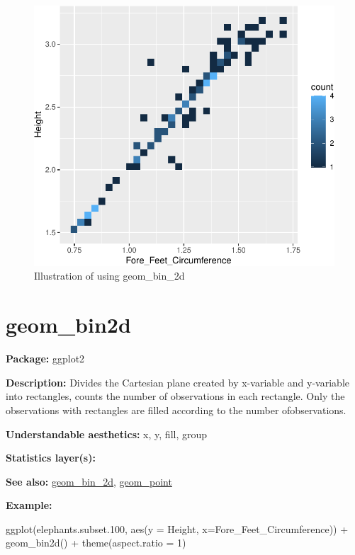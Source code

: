 \documentclass[
]{book}
\newenvironment{Shaded}{\begin{snugshade}}{\end{snugshade}}
\newcommand{\AttributeTok}[1]{\textcolor[rgb]{0.77,0.63,0.00}{#1}}
\newcommand{\DecValTok}[1]{\textcolor[rgb]{0.00,0.00,0.81}{#1}}
\newcommand{\FloatTok}[1]{\textcolor[rgb]{0.00,0.00,0.81}{#1}}
\newcommand{\FunctionTok}[1]{\textcolor[rgb]{0.00,0.00,0.00}{#1}}
\newcommand{\NormalTok}[1]{#1}
\newcommand{\SpecialCharTok}[1]{\textcolor[rgb]{0.00,0.00,0.00}{#1}}
\begin{document}
\begin{figure}
\centering
\includegraphics{Data-Visualisation-geom-Encyclopedia_files/figure-latex/unnamed-chunk-25-1.pdf}
\caption{\label{fig:unnamed-chunk-25}Illustration of using geom\_bin\_2d}
\end{figure}

\hypertarget{geom_bin2d}{%
\section{geom\_bin2d}\label{geom_bin2d}}

\textbf{Package: } ggplot2 \autocite{R-ggplot2}

\textbf{Description: } Divides the Cartesian plane created by x-variable and y-variable into rectangles, counts the number of observations in each rectangle. Only the observations with rectangles are filled according to the number ofobservations.

\textbf{Understandable aesthetics: } x, y, fill, group

\textbf{Statistics layer(s): }

\textbf{See also: } \protect\hyperlink{bin_2d}{geom\_bin\_2d}, \protect\hyperlink{point}{geom\_point}

\textbf{Example:}

\begin{Shaded}
\begin{Highlighting}[]
\FunctionTok{ggplot}\NormalTok{(elephants.subset}\FloatTok{.100}\NormalTok{, }\FunctionTok{aes}\NormalTok{(}\AttributeTok{y =}\NormalTok{ Height, }\AttributeTok{x=}\NormalTok{Fore\_Feet\_Circumference)) }\SpecialCharTok{+}
  \FunctionTok{geom\_bin2d}\NormalTok{() }\SpecialCharTok{+} 
  \FunctionTok{theme}\NormalTok{(}\AttributeTok{aspect.ratio =} \DecValTok{1}\NormalTok{)}
\end{Highlighting}
\end{Shaded}
\end{document}
